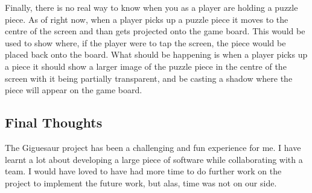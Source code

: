 \documentclass{article}
\begin{document}
Finally, there is no real way to know when you as a player are holding a puzzle
piece. As of right now, when a player picks up a puzzle piece it moves to the
centre of the screen and than gets projected onto the game board. This would be
used to show where, if the player were to tap the screen, the piece would be
placed back onto the board. What should be happening is when a player picks up a
piece it should show a larger image of the puzzle piece in the centre of the
screen with it being partially transparent, and be casting a shadow where the
piece will appear on the game board.

\subsection{Final Thoughts}
The Giguesaur project has been a challenging and fun experience for me. I have
learnt a lot about developing a large piece of software while collaborating with
a team. I would have loved to have had more time to do further work on the
project to implement the future work, but alas, time was not on our side.


\clearpage





\clearpage
\printglossaries

\end{document}
